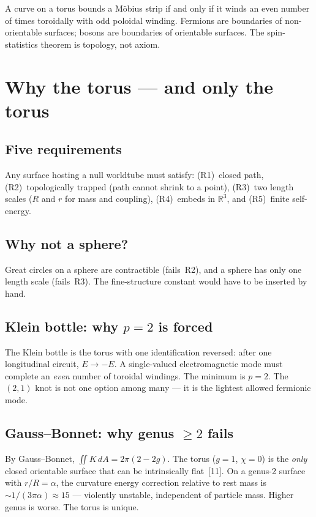\documentclass[10pt,twoside,a5paper]{article}
\begin{document}
A curve on a torus bounds a M\"obius strip if and only if it winds an even number of times toroidally with odd poloidal winding. Fermions are boundaries of non-orientable surfaces; bosons are boundaries of orientable surfaces. The spin-statistics theorem is topology, not axiom.


\section{Why the torus --- and only the torus}

\subsection{Five requirements}

Any surface hosting a null worldtube must satisfy: (R1)~closed path, (R2)~topologically trapped (path cannot shrink to a point), (R3)~two length scales ($R$ and $r$ for mass and coupling), (R4)~embeds in $\mathbb{R}^3$, and (R5)~finite self-energy.

\subsection{Why not a sphere?}

Great circles on a sphere are contractible (fails~R2), and a sphere has only one length scale (fails~R3). The fine-structure constant would have to be inserted by hand.

\subsection{Klein bottle: why $p = 2$ is forced}

The Klein bottle is the torus with one identification reversed: after one longitudinal circuit, $E \to -E$. A single-valued electromagnetic mode must complete an \emph{even} number of toroidal windings. The minimum is $p = 2$. The $(2,1)$ knot is not one option among many --- it is the lightest allowed fermionic mode.

\subsection{Gauss--Bonnet: why genus $\geq 2$ fails}

By Gauss--Bonnet, $\iint K\,dA = 2\pi(2-2g)$. The torus ($g=1$, $\chi=0$) is the \emph{only} closed orientable surface that can be intrinsically flat~[11]. On a genus-2 surface with $r/R = \alpha$, the curvature energy correction relative to rest mass is $\sim 1/(3\pi\alpha) \approx 15$ --- violently unstable, independent of particle mass. Higher genus is worse. The torus is unique.
\end{document}
